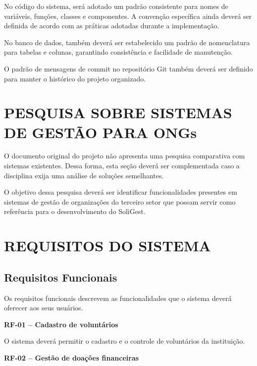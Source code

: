 \documentclass[12pt,a4paper]{article}
\begin{document}
No código do sistema, será adotado um padrão consistente para nomes de
variáveis, funções, classes e componentes. A convenção específica ainda
deverá ser definida de acordo com as práticas adotadas durante a
implementação.

No banco de dados, também deverá ser estabelecido um padrão de
nomenclatura para tabelas e colunas, garantindo consistência e
facilidade de manutenção.

O padrão de mensagens de commit no repositório Git também deverá ser
definido para manter o histórico do projeto organizado.


\section*{PESQUISA SOBRE SISTEMAS DE GESTÃO PARA ONGs}

O documento original do projeto não apresenta uma pesquisa comparativa
com sistemas existentes. Dessa forma, esta seção deverá ser
complementada caso a disciplina exija uma análise de soluções
semelhantes.

O objetivo dessa pesquisa deverá ser identificar funcionalidades
presentes em sistemas de gestão de organizações do terceiro setor que
possam servir como referência para o desenvolvimento do SoliGest.


\section*{REQUISITOS DO SISTEMA}

\subsection*{Requisitos Funcionais}

Os requisitos funcionais descrevem as funcionalidades que o sistema
deverá oferecer aos seus usuários.

\textbf{RF-01 -- Cadastro de voluntários}

O sistema deverá permitir o cadastro e o controle de voluntários da
instituição.

\textbf{RF-02 -- Gestão de doações financeiras}
\end{document}
